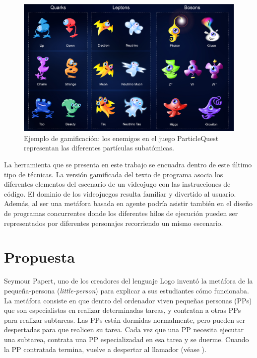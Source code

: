 \documentclass{llncs}
\begin{document}
\begin{figure}[ht]
\begin{center}
\includegraphics[scale=0.3]{images/particlequest.eps}
\caption{Ejemplo de gamificación: los enemigos en el juego ParticleQuest representan las diferentes partículas subatómicas.
\label{fig:particlequest}}
\end{center}
\end{figure}

La herramienta que se presenta en este trabajo se encuadra dentro de este último tipo de técnicas. La versión gamificada del texto de programa asocia los diferentes elementos del escenario de un videojugo con las instrucciones de código. El dominio de los videojuegos resulta familiar y divertido al usuario. Además, al ser una metáfora basada en agente \cite{travers1996programming} podría asistir también en el diseño de programas concurrentes donde los diferentes hilos de ejecución pueden ser representados por diferentes personajes recorriendo un mismo escenario.



\section{Propuesta}
\label{sec:proposal}

Seymour Papert, uno de los creadores del lenguaje Logo inventó la
metáfora de la pequeña-persona ({\em little-person}) para explicar a
sus estudiantes cómo funcionaba. La metáfora consiste en que dentro del ordenador viven pequeñas personas (PPs) que son especialistas en
realizar determinadas tareas, y contratan a otras PPs para realizar
subtareas. Las PPs están dormidas normalmente, pero pueden ser
despertadas para que realicen su tarea. Cada vez que una PP necesita
ejecutar una subtarea, contrata una PP especializadad en esa tarea y
se duerme. Cuando la PP contratada termina, vuelve a despertar al
llamador (véase \cite{harvey1985computer}).
\end{document}
